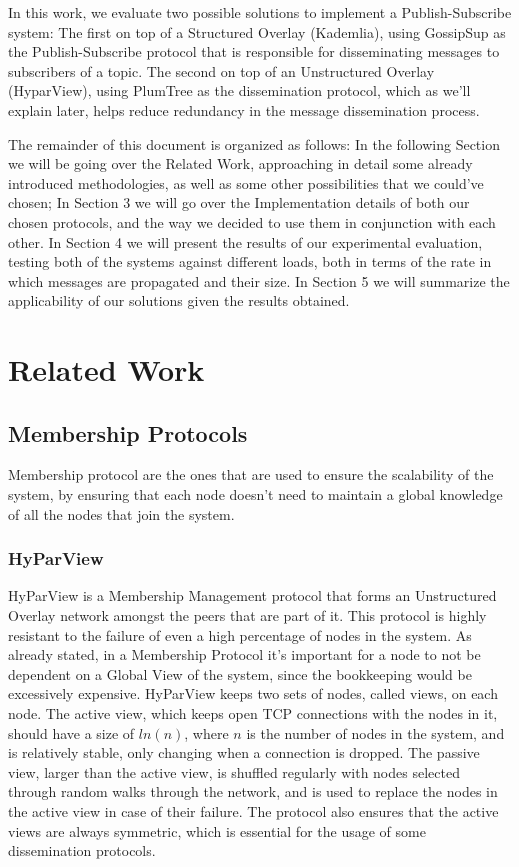 \documentclass[sigconf]{acmart}
\begin{document}
In this work, we evaluate two possible solutions to implement a Publish-Subscribe system: The first on top of a Structured Overlay (Kademlia), using GossipSup as the Publish-Subscribe protocol that is responsible for disseminating messages to subscribers of a topic.
The second on top of an Unstructured Overlay (HyparView), using PlumTree as the dissemination protocol, which as we’ll explain later, helps reduce redundancy in the message dissemination process.

The remainder of this document is organized as follows:
In the following Section we will be going over the Related Work, approaching in detail some already introduced methodologies, as well as some other possibilities that we could’ve chosen; In Section 3 we will go over the Implementation details of both our chosen protocols, and the way we decided to use them in conjunction with each other. In Section 4 we will present the results of our experimental evaluation, testing both of the systems against different loads, both in terms of the rate in which messages are propagated and their size. In Section 5 we will summarize the applicability of our solutions given the results obtained.

\section{Related Work}

\subsection{Membership Protocols}

Membership protocol are the ones that are used to ensure the scalability of the system, by ensuring that each node doesn't need to maintain a global knowledge of all the nodes that join the system. 

\subsubsection{HyParView}

HyParView is a Membership Management protocol that forms an Unstructured Overlay network amongst the peers that are part of it. 
This protocol is highly resistant to the failure of even a high percentage of nodes in the system. As already stated, in a Membership Protocol it’s important for a node to not be dependent on a Global View of the system, since the bookkeeping would be excessively expensive. HyParView keeps two sets of nodes, called views, on each node. The active view, which keeps open TCP connections with the nodes in it, should have a size of $ln(n)$, where $n$ is the number of nodes in the system, and is relatively stable, only changing when a connection is dropped. The passive view, larger than the active view, is shuffled regularly with nodes selected through random walks through the network, and is used to replace the nodes in the active view in case of their failure. 
The protocol also ensures that the active views are always symmetric, which is essential for the usage of some dissemination protocols.
\end{document}

